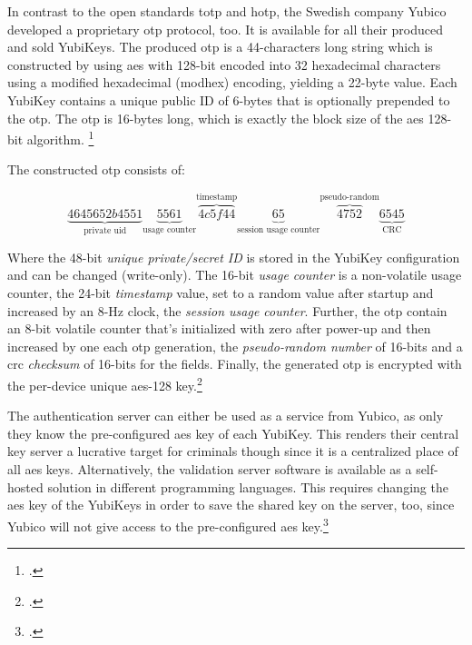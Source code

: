 In contrast to the open standards \gls{totp} and \gls{hotp}, the Swedish company Yubico developed a proprietary \gls{otp} protocol, too. It is available for all their produced and sold YubiKeys. The produced \gls{otp} is a 44-characters long string which is constructed by using \gls{aes} with 128-bit encoded into 32 hexadecimal characters using a modified hexadecimal (\frqq modhex\flqq) encoding, yielding a 22-byte value. Each YubiKey contains a unique public ID of 6-bytes that is optionally prepended to the \gls{otp}. The \gls{otp} is 16-bytes long, which is exactly the block size of the \gls{aes} 128-bit algorithm. \footcites[][]{10.1007/978-3-642-38004-4_17}[See][]{Jacobs:2016:STA:2953926.2953927}

The constructed \gls{otp} consists of:

\begin{equation*}
	\underbrace{4645652b4551}_\text{private uid}\underbrace{5561}_\text{usage counter}\overbrace{4c5f44}^\text{timestamp}\underbrace{65}_\text{session usage counter}\overbrace{4752}^\text{pseudo-random}\underbrace{6545}_\text{CRC}
\end{equation*}

Where the 48-bit \textit{unique private/secret ID} is stored in the YubiKey configuration and can be changed (write-only). The 16-bit \textit{usage counter} is a non-volatile usage counter, the 24-bit \textit{timestamp} value, set to a random value after startup and increased by an 8-Hz clock, the \textit{session usage counter}. Further, the \gls{otp} contain an 8-bit volatile counter that's initialized with zero after power-up and then increased by one each \gls{otp} generation, the \textit{pseudo-random number} of 16-bits and a \gls{crc} \textit{checksum} of 16-bits for the fields. Finally, the generated \gls{otp} is encrypted with the per-device unique \gls{aes}-128 key.\footcites[See][8--9, 33--34]{yubico-otp}

The authentication server can either be used as a service from Yubico, as only they know the pre-configured \gls{aes} key of each YubiKey. This renders their central key server a lucrative target for criminals though since it is a centralized place of all \gls{aes} keys. Alternatively, the validation server software is available as a self-hosted solution in different programming languages. This requires changing the \gls{aes} key of the YubiKeys in order to save the shared key on the server, too, since Yubico will not give access to the pre-configured \gls{aes} key.\footcites[See][8--9]{yubico-cloud}